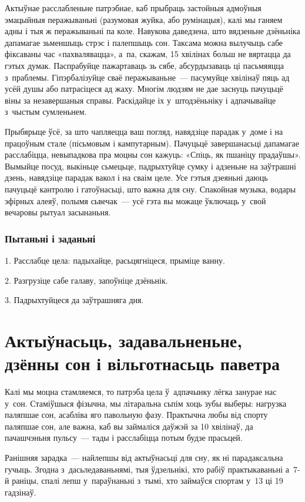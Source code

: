 Актыўнае расслабленьне патрэбнае, каб прыбраць застойныя адмоўныя эмацыйныя перажываньні (разумовая жуйка, або румінацыя), калі мы ганяем адны і тыя ж перажываньні па коле. Навукова даведзена, што вядзеньне дзёньніка дапамагае зьменшыць стрэс і палепшыць сон. Таксама можна вылучыць сабе фіксаваны час «пахвалявацца», а~па, скажам, 15 хвілінах больш не вяртацца да гэтых думак. Паспрабуйце пажартаваць зь сябе, абсурдызаваць ці пасьмяяцца з~праблемы. Гіпэрбалізуйце сваё перажываньне~--- пасумуйце хвілінаў пяць ад усёй душы або патрасіцеся ад жаху. Многім людзям не дае заснуць пачуцьцё віны за незавершаныя справы. Раскідайце іх у~штодзёньніку і адпачывайце з~чыстым сумленьнем.

Прыбярыце ўсё, за што чапляецца ваш погляд, навядзіце парадак у~доме і на працоўным стале (пісьмовым і кампутарным). Пачуцьцё завершанасьці дапамагае расслабіцца, невыпадкова пра моцны сон кажуць: «Спіць, як пшаніцу прадаўшы». Вымыйце посуд, выкіньце сьмецьце, падрыхтуйце сумку і адзеньне на заўтрашні дзень, навядзіце парадак вакол і на сваім целе. Усе гэтыя дзеяньні даюць пачуцьцё кантролю і гатоўнасьці, што важна для сну. Спакойная музыка, водары эфірных алеяў, полымя сьвечак~--- усё гэта вы можаце ўключаць у~свой вечаровы рытуал засынаньня.

\subsubsection{Пытаньні і заданьні}

1. Расслабце цела: падыхайце, расьцягніцеся, прыміце ванну.

2. Разгрузіце сабе галаву, запоўніце дзёньнік.

3. Падрыхтуйцеся да заўтрашняга дня.


\section{Актыўнасьць, задавальненьне, дзённы сон і вільготнасьць паветра}

Калі мы моцна стамляемся, то патрэба цела ў~адпачынку лёгка занурае нас у~сон. Стаміўшыся фізычна, мы літаральна сьпім хоць зубы выберы: нагрузка паляпшае сон, асабліва яго павольную фазу. Практычна любы від спорту паляпшае сон, але важна, каб вы займаліся даўжэй за 10 хвілінаў, да пачашчэньня пульсу~--- тады і расслабіцца потым будзе прасьцей.

Ранішняя зарадка~--- найлепшы від актыўнасьці для сну, як ні парадаксальна гучыць. Згодна з~дасьледаваньнямі, тыя ўдзельнікі, хто рабіў практыкаваньні а~7-й раніцы, спалі лепш у~параўнаньні з~тымі, хто займаўся спортам у~13 ці 19 гадзінаў.

